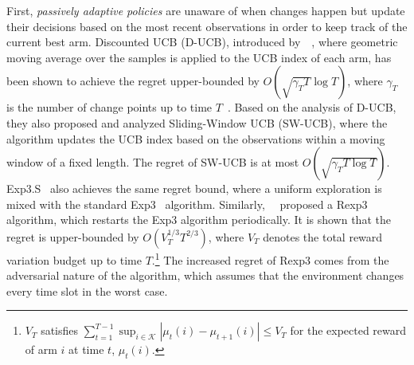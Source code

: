 \documentclass[letterpaper]{article} %
\newcommand{\blue}{}
\begin{document}
First, {\em passively adaptive policies} are unaware of when changes happen but update their decisions based on the most recent observations in order to keep track of the current best arm. Discounted UCB (D-UCB), introduced by~\citeauthor{kocsis2006discounted}~, where geometric moving average over the samples is applied to the UCB index of each arm, has been shown to achieve the regret upper-bounded by $O(\sqrt{\gamma_T T}\log T)$, where $\gamma_T$ is the number of change points up to time $T$~\cite{garivier2008upper}. Based on the analysis of D-UCB, they also proposed and analyzed Sliding-Window UCB (SW-UCB), where the algorithm updates the UCB index based on the observations within a moving window of a fixed length. The regret of SW-UCB is at most $O(\sqrt{\gamma_T T\log T})$. Exp3.S~\cite{doi:10.1137/S0097539701398375} also achieves the same regret bound, where a uniform exploration is mixed with the standard Exp3~\cite{cesa2006prediction} algorithm.
Similarly,~\citeauthor{besbes2014stochastic}~ proposed a Rexp3 algorithm, which restarts the Exp3 algorithm periodically. It is shown that the regret is upper-bounded by $O(V_T^{1/3}T^{2/3})$, where $V_T$ denotes the total reward variation budget up to time $T$.\footnote{\blue $V_T$ satisfies $\sum_{t=1}^{T-1} \sup_{i \in \mathcal{K}} |\mu_t(i) - \mu_{t+1}(i)| \leq V_T$ for the expected reward of arm $i$ at time $t$, $\mu_t(i)$.} The increased regret of Rexp3 comes from the adversarial nature of the algorithm, which assumes that the environment changes every time slot
in the worst case.
\end{document}
